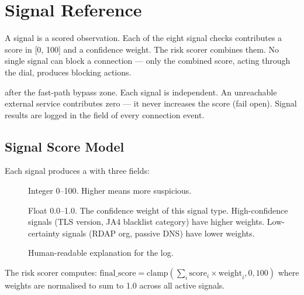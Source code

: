 
\chapter{Signal Reference}
\label{ch:signals}

\begin{chapterquote}
A signal is a scored observation. Each of the eight signal checks contributes a score
in [0, 100] and a confidence weight. The risk scorer combines them. No single signal
can block a connection — only the combined score, acting through the dial, produces
blocking actions.
\end{chapterquote}

 after the fast-path bypass zone.
Each signal is independent. An unreachable external service contributes zero — it
never increases the score (fail open). Signal results are logged in the
 field of every connection event.

\section{Signal Score Model}

Each signal produces a  with three fields:

\begin{description}
  \item[] Integer 0–100. Higher means more suspicious.
  \item[] Float 0.0–1.0. The confidence weight of this signal type.
        High-confidence signals (TLS version, JA4 blacklist category) have higher weights.
        Low-certainty signals (RDAP org, passive DNS) have lower weights.
  \item[] Human-readable explanation for the log.
\end{description}

The risk scorer computes: $\text{final\_score} = \text{clamp}(\sum_i \text{score}_i \times \text{weight}_i, 0, 100)$
where weights are normalised to sum to 1.0 across all active signals.

